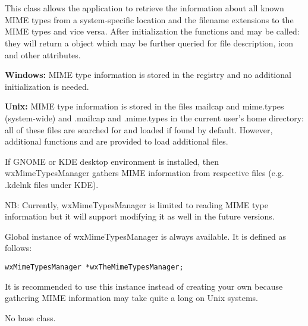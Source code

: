 \section{}\label{wxmimetypesmanager}

This class allows the application to retrieve the information about all known
MIME types from a system-specific location and the filename extensions to the
MIME types and vice versa. After initialization the functions
and  
may be called: they will return a  object which
may be further queried for file description, icon and other attributes.

{\bf Windows:} MIME type information is stored in the registry and no additional
initialization is needed.

{\bf Unix:} MIME type information is stored in the files mailcap and mime.types
(system-wide) and .mailcap and .mime.types in the current user's home directory:
all of these files are searched for and loaded if found by default. However,
additional functions 
 and 
 are
provided to load additional files.

If GNOME or KDE desktop environment is installed, then wxMimeTypesManager 
gathers MIME information from respective files (e.g. .kdelnk files under KDE).

NB: Currently, wxMimeTypesManager is limited to reading MIME type information
but it will support modifying it as well in the future versions.


Global instance of wxMimeTypesManager is always available. It is defined
as follows:

\begin{verbatim}
wxMimeTypesManager *wxTheMimeTypesManager;
\end{verbatim}

It is recommended to use this instance instead of creating your own because
gathering MIME information may take quite a long on Unix systems.


No base class.


